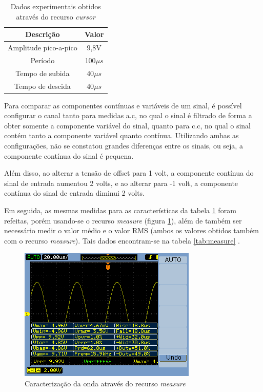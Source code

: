 \documentclass[a4paper]{article} %
\begin{document}
\begin{table}[h]
\begin{centering}
\caption{Dados experimentais obtidos através do recurso \textit{cursor} \label{tab:cursors}}

\begin{tabular}{cc}
\hline 
Descrição & Valor\tabularnewline
\hline
Amplitude pico-a-pico & 9,8V\tabularnewline
Período & 100$\mu s$\tabularnewline
Tempo de subida & 40$\mu s$\tabularnewline
Tempo de descida  & 40$\mu s$\tabularnewline
\hline
\end{tabular}
\par\end{centering}

\end{table}

Para comparar as componentes contínuas e variáveis de um sinal, é possível configurar o canal tanto para medidas a.c, no qual o sinal é filtrado de forma a obter somente a componente variável do sinal, quanto para c.c, no qual o sinal contém tanto a componente variável quanto contínua. Utilizando ambas as configurações, não se constatou grandes diferenças entre os sinais, ou seja, a componente contínua do sinal é pequena. 

Além disso, ao alterar a tensão de offset para 1 volt, a componente contínua do sinal de entrada aumentou 2 volts, e ao alterar para -1 volt, a componente contínua do sinal de entrada diminui 2 volts. 

Em seguida, as mesmas medidas para as características da tabela \ref{tab:cursors} foram refeitas, porém usando-se o recurso \textit{measure} (figura \ref{fig:Fig-1}), além de também ser necessário medir o valor médio e o valor RMS (ambos os valores obtidos também com o recurso \textit{measure}). Tais dados encontram-se na tabela \ref{tab:measure} .\\ 

\begin{figure}[h!]
\begin{centering}
\includegraphics[scale=0.7]{Imagens/1}\caption{Caracterização da onda através do recurso \textit{measure} \label{fig:Fig-1}}
\par\end{centering}
\end{figure}
\end{document}

